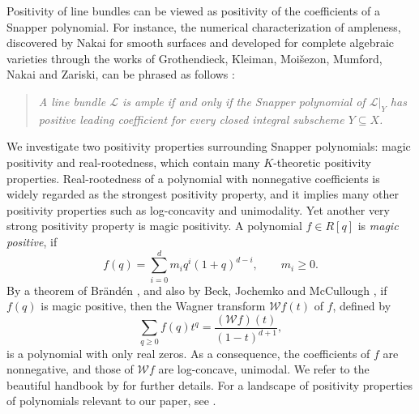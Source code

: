 \documentclass[11pt,a4paper,reqno]{amsart}
\theoremstyle{results}
\theoremstyle{definitions}
\newcommand{\cL}{\mathcal{L}}
\newcommand{\W}{\mathcal{W}}      %
\begin{document}
Positivity of line bundles can be viewed as positivity of the coefficients of a Snapper polynomial.  For instance, the numerical
characterization of ampleness, discovered by Nakai for smooth surfaces
\cite{nakai1963criterion} and developed for complete algebraic
varieties through the works of Grothendieck, Kleiman, Moi\v{s}ezon, Mumford, Nakai
and Zariski, can be phrased as follows \cite[Chapter~III]{kleiman1966ampleness}:
\begin{quote}\itshape
  A line bundle $\cL$ is ample if and only if the Snapper polynomial of $\cL|_Y$
  has positive leading coefficient for every closed integral subscheme
  $Y \subseteq X$.
\end{quote}

We investigate two positivity properties surrounding Snapper polynomials: magic positivity and
real-rootedness, which contain many $K$-theoretic positivity properties. Real-rootedness of a polynomial with nonnegative coefficients is widely regarded as the strongest positivity property, and it implies many other positivity properties such as log-concavity and unimodality. 
Yet another very strong positivity property is magic positivity. A polynomial $f \in R[q]$ is \emph{magic positive}, if
\[
  f(q)=\sum_{i=0}^d m_i q^i(1+q)^{d-i},\qquad m_i\geqslant0.
\]
By a theorem of Br\"and\'en \cite[Theorem 4.2]{branden2006linear}, and also by 
Beck, Jochemko and McCullough \cite[Corollary 4.5]{beck2019h}, 
if $f(q)$ is magic positive, then the Wagner transform $\W f(t)$ of $f$, defined by
\begin{equation}\label{eq:W}
 \sum_{q\geqslant0}f(q)t^q=\frac{(\W f)(t)}{(1-t)^{d+1}}, 
\end{equation} is a polynomial with only real zeros. 
As a consequence, the coefficients of $f$ are nonnegative, and those of $\W f$ are log-concave, unimodal. 
We refer to the beautiful handbook by \cite{branden2015unimodality} for further details. For a landscape of positivity properties of polynomials relevant to our paper, see .
\end{document}
